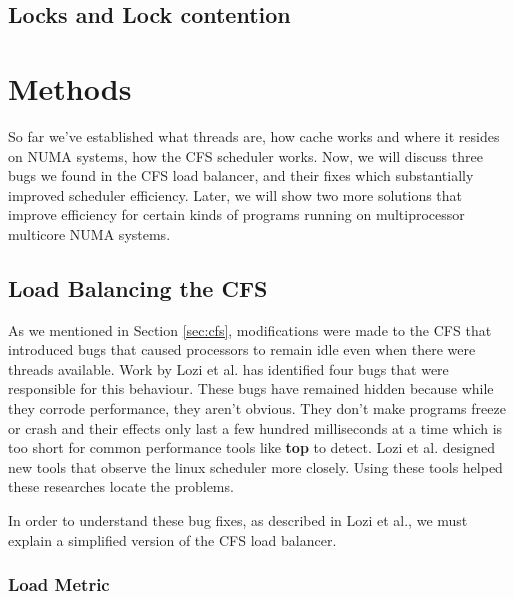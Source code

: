 \documentclass{sig-alternate}
\begin{document}
\subsection{Locks and Lock contention}
\label{sec:locks}


\section{Methods}
\label{sec:methods}

So far we've established what threads are, how cache works and where it resides on NUMA systems, how the CFS scheduler works. Now, we will discuss three bugs we found in the CFS load balancer, and their fixes which substantially improved scheduler efficiency. Later, we will show two more solutions that improve efficiency for certain kinds of programs running on multiprocessor multicore NUMA systems.

\subsection{Load Balancing the CFS}
\label{sec:loadbalance}

As we mentioned in Section \ref{sec:cfs}, modifications were made to the CFS that introduced bugs that caused processors to remain idle even when there were threads available. Work by Lozi et al. has identified four bugs that were responsible for this behaviour. These bugs have remained hidden because while they corrode performance, they aren't obvious. They don't make programs freeze or crash and their effects only last a few hundred milliseconds at a time which is too short for common performance tools like \textbf{top} to detect. Lozi et al. designed new tools that observe the linux scheduler more closely. Using these tools helped these researches locate the problems.~\cite{Lozi:2016}

In order to understand these bug fixes, as described in Lozi et al., we must explain a simplified version of the CFS load balancer.~\cite{Lozi:2016}

\subsubsection{Load Metric}
\label{sec:loadmetric}
\end{document}
